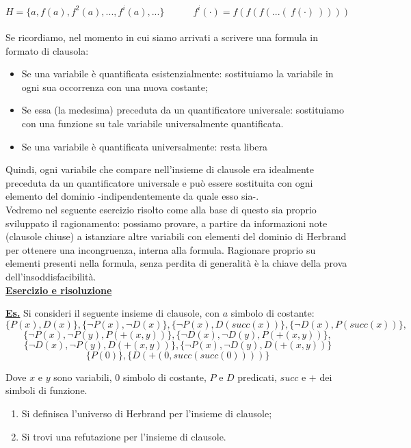 \documentclass[a4paper,10pt]{article}
\begin{document}
$$H=\{a,f(a),f^2(a),...,f^i(a),...\}\quad\quad\quad f^i(\cdot)=f(f(f(...(\ f(\cdot)\ ))))$$\\
Se ricordiamo, nel momento in cui siamo arrivati a scrivere una formula in formato di clausola:
\begin{itemize}
    \item Se una variabile è quantificata esistenzialmente: sostituiamo la variabile in ogni sua occorrenza con una nuova costante;
    \item Se essa (la medesima) preceduta da un quantificatore universale: sostituiamo con una funzione su tale variabile universalmente quantificata.
    \item Se una variabile è quantificata universalmente: resta libera
\end{itemize}
Quindi, ogni variabile che compare nell'insieme di clausole era idealmente preceduta da un quantificatore universale e può essere sostituita con ogni elemento del dominio -indipendentemente da quale esso sia-. \\ 
Vedremo nel seguente esercizio risolto come alla base di questo sia proprio sviluppato il ragionamento: possiamo provare, a partire da informazioni note (clausole chiuse) a istanziare altre variabili con elementi del dominio di Herbrand per ottenere una incongruenza, interna alla formula. Ragionare proprio su elementi presenti nella formula, senza perdita di generalità è la chiave della prova dell'insoddisfacibilità.\\[0.1cm]


\underline{\textbf{Esercizio e risoluzione}}

\begin{osservazioni}

    \underline{\textbf{Es.}}
    Si consideri il seguente insieme di clausole, con $a$ simbolo di costante:
    $$\{P(x), D(x)\}, \{\lnot P(x), \lnot D(x)\}, \{\lnot P(x), D(succ(x))\}, \{\lnot D(x), P(succ(x))\},$$
    $$\{\lnot P(x), \lnot P(y), P(+(x, y))\}, \{\lnot D(x), \lnot D(y), P(+(x, y))\},$$
    $$\{\lnot D(x), \lnot P(y), D(+(x, y))\}, \{\lnot P(x), \lnot D(y), D(+(x, y))\}$$
    $$\{P(0)\}, \{D(+(0, succ(succ(0))))\}$$

    Dove $x$ e $y$ sono variabili, $0$ simbolo di costante, $P$ e $D$ predicati, $succ$ e $+$ dei simboli di funzione.
    \begin{enumerate}
        \item Si definisca l'universo di Herbrand per l'insieme di clausole;
        \item Si trovi una refutazione per l'insieme di clausole.\\[0.1pt]
    \end{enumerate}

\end{osservazioni}
\end{document}
